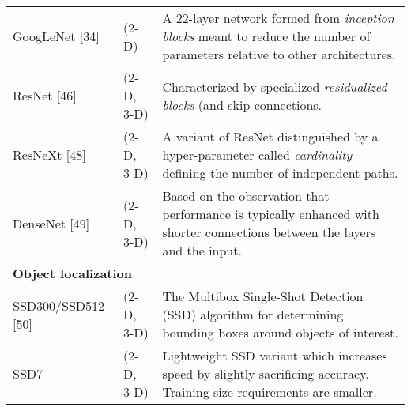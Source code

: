 \begin{table}[!htb]
\begin{tabular*}{\textwidth}{ll@{\extracolsep{\fill}}l}
  GoogLeNet [34] & (2-D) & 
    \begin{minipage}[t]{0.6\columnwidth}%
        A 22-layer network formed from {\em inception blocks} meant
        to reduce the number of parameters relative to other architectures.
    \end{minipage} \\ \vspace{0.2cm} 
  ResNet [46]  & (2-D, 3-D) & 
    \begin{minipage}[t]{0.6\columnwidth}%
        Characterized by specialized {\em residualized blocks} (and
        skip connections. %
    \end{minipage} \\ \vspace{0.2cm} 
  ResNeXt [48] & (2-D, 3-D) &
    \begin{minipage}[t]{0.6\columnwidth}%
        A variant of ResNet distinguished by a hyper-parameter called 
        {\em cardinality} defining the number of independent paths. %
    \end{minipage} \\ \vspace{0.3cm} 
  DenseNet [49] & (2-D, 3-D) & 
    \begin{minipage}[t]{0.6\columnwidth}%
        Based on the observation that performance is typically enhanced 
        with shorter connections between the layers and the input.%
    \end{minipage} \\
\midrule    
\multicolumn{3}{l}{\textbf{Object localization}} 
  \vspace{0.25cm} \\ \vspace{0.2cm} 
  SSD300/SSD512 [50] & (2-D, 3-D) & 
    \begin{minipage}[t]{0.6\columnwidth}%
        The Multibox Single-Shot Detection (SSD) algorithm for
        determining bounding boxes around objects of interest. %
    \end{minipage} \\ \vspace{0.2cm} 
  SSD7 & (2-D, 3-D) & 
    \begin{minipage}[t]{0.6\columnwidth}%
        Lightweight SSD variant which increases speed by slightly sacrificing
        accuracy.  Training size requirements are smaller. %
  \end{minipage} \\
\bottomrule
\end{tabular*}
\end{table}


